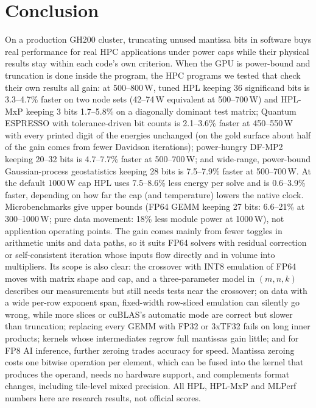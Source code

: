 \documentclass[conference]{IEEEtran}
\newcommand{\W}{\,W}
\newcommand{\pct}{\%}
\begin{document}
\section{Conclusion}\label{sec:conclusion}

On a production GH200 cluster, truncating unused mantissa bits in software buys real performance for real HPC
applications under power caps while their physical results stay within each code's own criterion. When the GPU is
power-bound and truncation is done inside the program, the HPC programs we tested that check their own results all
gain: at 500--800\W, tuned HPL keeping 36 significand bits is 3.3--4.7\pct{} faster on two node sets (42--74\W{}
equivalent at 500--700\W) and HPL-MxP keeping 3 bits 1.7--5.8\pct{} on a diagonally dominant test matrix; Quantum ESPRESSO with tolerance-driven bit counts
is 2.1--3.6\pct{} faster at 450--550\W{} with every printed digit of the energies unchanged (on the gold surface about
half of the gain comes from fewer Davidson iterations); power-hungry DF-MP2 keeping 20--32 bits is 4.7--7.7\pct{}
faster at 500--700\W; and wide-range, power-bound Gaussian-process geostatistics keeping 28 bits is 7.5--7.9\pct{}
faster at 500--700\W. At the default 1000\W{} cap HPL uses 7.5--8.6\pct{} less energy per solve and is 0.6--3.9\pct{}
faster, depending on how far the cap (and temperature) lowers the native clock. Microbenchmarks give
upper bounds (FP64 GEMM keeping 27 bits: 6.6--21\pct{} at 300--1000\W; pure data movement: 18\pct{} less module power
at 1000\W), not application operating points. The gain comes mainly from fewer toggles in arithmetic units and data
paths, so it suits FP64 solvers with residual correction or self-consistent iteration whose inputs flow directly and
in volume into multipliers. Its scope is also clear: the crossover with INT8 emulation of FP64 moves with matrix
shape and cap, and a three-parameter model in $(m,n,k)$ describes our measurements but still needs tests near the
crossover; on data with a wide per-row exponent span, fixed-width row-sliced emulation can silently go wrong,
while more slices or cuBLAS's automatic mode are correct but slower than truncation; replacing every GEMM with FP32
or 3xTF32 fails on long inner products; kernels whose intermediates regrow full mantissas gain little; and for FP8 AI
inference, further zeroing trades accuracy for speed. Mantissa zeroing costs one bitwise operation per element, which
can be fused into the kernel that produces the operand, needs no hardware support, and complements format changes,
including tile-level mixed precision. All HPL, HPL-MxP and MLPerf numbers here are research results, not official
scores.
\end{document}
